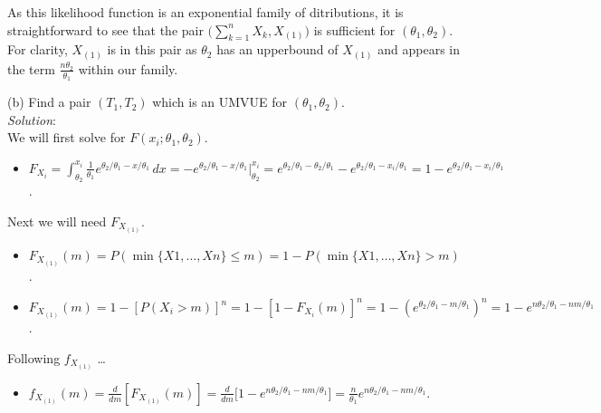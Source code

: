 \documentclass[12pt]{article}
\newcommand{\ds}{\displaystyle}
\begin{document}
As this likelihood function is an exponential family of ditributions, it is straightforward to see that the pair $ \ds \bigl( \sum_{k=1}^{n} X_{k} , X_{(1)} \bigr) $ is sufficient for $ (\theta_{1}, \theta_{2}) $. \\

For clarity, $ X_{(1)} $ is in this pair as $ \theta_{2} $ has an upperbound of $ X_{(1)} $ and appears in the term $ \ds \frac{n\theta_{2}}{\theta_{1}} $ within our family. \\

\vspace{2.5mm}
\newpage

(b) Find a pair $ (T_{1}, T_{2}) $ which is an UMVUE for $ (\theta_{1}, \theta_{2}) $.
\vspace{2.5mm} \\
\textit{Solution}:
\vspace{2.5mm} \\ 

\noindent
We will first solve for $ F( x_{i}; \theta_{1}, \theta_{2} ) $. 

\begin{itemize}
    \item $ \ds F_{X_{i}} = \int_{\theta_{2}}^{x_{i}} \frac{1}{\theta_{1}}e^{\theta_{2} / \theta_{1} - x / \theta_{1}} \,dx = -e^{\theta_{2} / \theta_{1} - x / \theta_{1}} \Big|_{\theta_{2}}^{x_{i}} = e^{\theta_{2} / \theta_{1} - \theta_{2} / \theta_{1}} -e^{\theta_{2} / \theta_{1} - x_{i} / \theta_{1}} = 1 - e^{\theta_{2} / \theta_{1} - x_{i} / \theta_{1}} $.
\end{itemize}

\noindent
Next we will need $ F_{X_{(1)}} $. 

\begin{itemize}
    \item $ \ds F_{X_{(1)}}(m) = P(\min\{ X{1}, \dots, X{n} \} \le m) = 1 - P(\min\{ X{1}, \dots, X{n} \} > m) $.
    \item $ \ds F_{X_{(1)}}(m) = 1 - [ P(X_{i} > m)]^{n} = 1 - [ 1 - F_{X_{i}}(m) ]^{n} =  1 - (e^{\theta_{2} / \theta_{1} - m / \theta_{1}})^{n} =  1 - e^{n\theta_{2} / \theta_{1} - nm / \theta_{1}} $.
\end{itemize}

\noindent
Following $ f_{X_{(1)}} $ \dots

\begin{itemize}
    \item $ \ds f_{X_{(1)}}(m) = \frac{d}{dm} [ F_{X_{(1)}}(m) ] = \frac{d}{dm} \bigl[ 1 - e^{n\theta_{2} / \theta_{1} - nm / \theta_{1}} \bigr] = \frac{n}{\theta_{1}}e^{n\theta_{2} / \theta_{1} - nm / \theta_{1}}  $.
\end{itemize}
\end{document}
